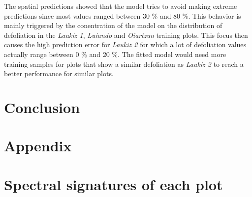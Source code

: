 \documentclass[review]{elsarticle}
\begin{document}
\noindent The spatial predictions showed that the model tries to avoid making extreme predictions since most values ranged between 30 \% and 80 \%. 
This behavior is mainly triggered by the conentration of the model on the distribution of defoliation in the \textit{Laukiz 1}, \textit{Luiando} and \textit{Oiartzun} training plots.
This focus then causes the high prediction error for \textit{Laukiz 2} for which a lot of defoliation values actually range between 0 \% and 20 \%.
The fitted model would need more training samples for plots that show a similar defoliation as \textit{Laukiz 2} to reach a better performance for similar plots.



\section{Conclusion}

\section{Appendix}

\appendix
\gdef\thesection{\Alph{section}} %
\makeatletter
\renewcommand\@seccntformat[1]{Appendix \csname the#1\endcsname.\hspace{0.5em}}
\makeatother

\section{Spectral signatures of each plot}
\end{document}
